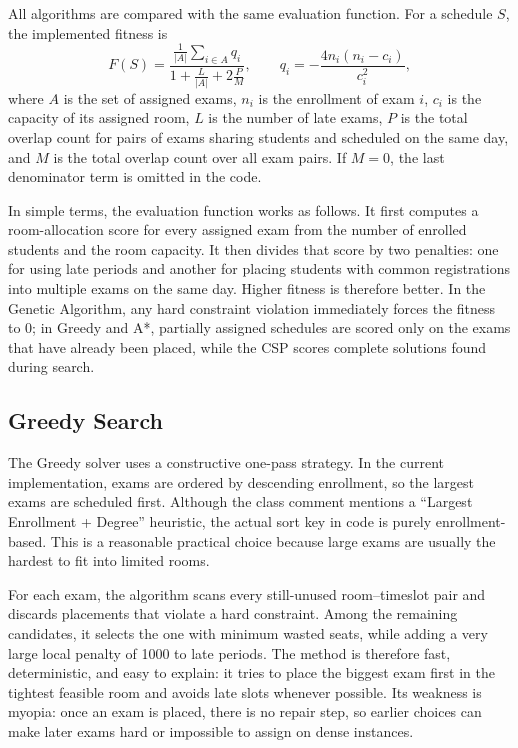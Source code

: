 All algorithms are compared with the same evaluation function. For a
schedule $S$, the implemented fitness is
\[
F(S)=
\frac{\frac{1}{|A|}\sum_{i \in A} q_i}
{1 + \frac{L}{|A|} + 2\frac{P}{M}},
\qquad
q_i = -\frac{4n_i(n_i-c_i)}{c_i^2},
\]
where $A$ is the set of assigned exams, $n_i$ is the enrollment of exam
$i$, $c_i$ is the capacity of its assigned room, $L$ is the number of
late exams, $P$ is the total overlap count for pairs of exams sharing
students and scheduled on the same day, and $M$ is the total overlap
count over all exam pairs. If $M=0$, the last denominator term is
omitted in the code.

In simple terms, the evaluation function works as follows. It first
computes a room-allocation score for every assigned exam from the number
of enrolled students and the room capacity. It then divides that score
by two penalties: one for using late periods and another for placing
students with common registrations into multiple exams on the same day.
Higher fitness is therefore better. In the Genetic Algorithm, any hard
constraint violation immediately forces the fitness to $0$; in Greedy
and A*, partially assigned schedules are scored only on the exams that
have already been placed, while the CSP scores complete solutions found
during search.

\subsection{Greedy Search}

The Greedy solver uses a constructive one-pass strategy. In the current
implementation, exams are ordered by descending enrollment, so the
largest exams are scheduled first. Although the class comment mentions a
``Largest Enrollment + Degree'' heuristic, the actual sort key in code
is purely enrollment-based. This is a reasonable practical choice
because large exams are usually the hardest to fit into limited rooms.

For each exam, the algorithm scans every still-unused room--timeslot
pair and discards placements that violate a hard constraint. Among the
remaining candidates, it selects the one with minimum wasted seats,
while adding a very large local penalty of 1000 to late periods. The
method is therefore fast, deterministic, and easy to explain: it tries
to place the biggest exam first in the tightest feasible room and avoids
late slots whenever possible. Its weakness is myopia: once an exam is
placed, there is no repair step, so earlier choices can make later exams
hard or impossible to assign on dense instances.

